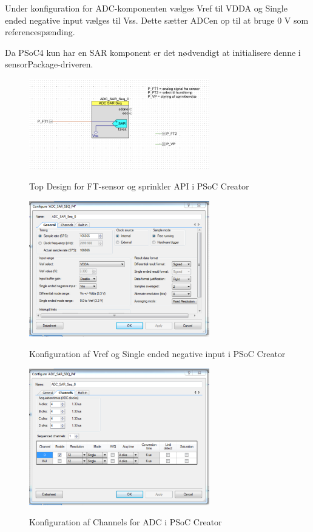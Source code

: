 Under konfiguration for ADC-komponenten vælges Vref til VDDA og Single ended negative input vælges til Vss. Dette sætter ADCen op til at bruge 0 V som referencespænding.

Da PSoC4 kun har en SAR komponent er det nødvendigt at initialisere denne i sensorPackage-driveren.

\begin{figure}[htb]
\centering
{\includegraphics[width=0.70\textwidth]{filer/pics/psoc_api_topdesign}}
\caption{Top Design for FT-sensor og sprinkler API i PSoC Creator}
\label{lab:psoc_api_topdesign}
\end{figure}

\begin{figure}[htb]
\centering
{\includegraphics[width=0.70\textwidth]{filer/pics/psoc_api_config1}}
\caption{Konfiguration af Vref og Single ended negative input i PSoC Creator}
\label{lab:psoc_api_config1}
\end{figure}

\begin{figure}[htb]
\centering
{\includegraphics[width=0.70\textwidth]{filer/pics/psoc_api_config2}}
\caption{Konfiguration af Channels for ADC i PSoC Creator}
\label{lab:psoc_api_config2}
\end{figure}